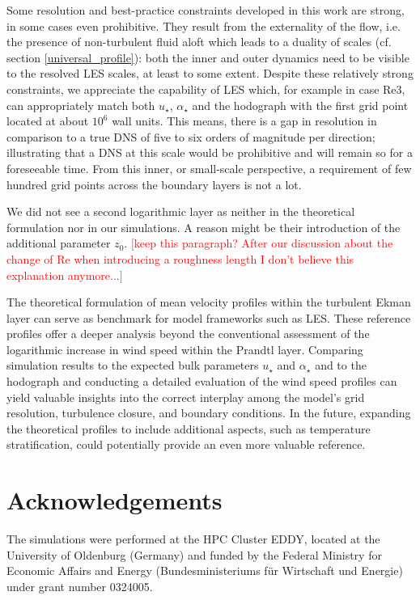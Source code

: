 \documentclass[a4paper,11pt]{article}
\newcommand{\todo}[1]{\textcolor{red}{$[$#1$]$}}
\begin{document}
Some resolution and best-practice constraints developed in this work are strong, in some cases even prohibitive. They result from the externality of the flow, i.e. the presence of non-turbulent fluid aloft which leads to a duality of scales (cf. section \ref{universal_profile}): both the inner and outer dynamics need to be visible to the resolved LES scales, at least to some extent. Despite these relatively strong constraints, we appreciate the capability of LES which, for example in case Re3, can appropriately match both $u_\star$, $\alpha_\star$ and the hodograph with the first grid point located at about $10^6$ wall units. This means, there is a gap in resolution in comparison to a true DNS of five to six orders of magnitude per direction; illustrating that a DNS at this scale would be prohibitive and will remain so for a foreseeable time. From this inner, or small-scale perspective, a requirement of few hundred grid points across the boundary layers is not a lot.

We did not see a second logarithmic layer as \cite{jiang2018large} neither in the theoretical formulation nor in our simulations. A reason might be their introduction of the additional parameter $z_0$. \todo{keep this paragraph? After our discussion about the change of Re when introducing a roughness length I don't believe this explanation anymore...}

The theoretical formulation of mean velocity profiles within the turbulent Ekman layer can serve as benchmark for model frameworks such as LES. These reference profiles offer a deeper analysis beyond the conventional assessment of the logarithmic increase in wind speed within the Prandtl layer. Comparing simulation results to the expected bulk parameters $u_\star$ and $\alpha_\star$ and to the hodograph and conducting a detailed evaluation of the wind speed profiles can yield valuable insights into the correct interplay among the model's grid resolution, turbulence closure, and boundary conditions. In the future, expanding the theoretical profiles to include additional aspects, such as temperature stratification, could potentially provide an even more valuable reference.

\section{Acknowledgements}

The simulations were performed at the HPC Cluster EDDY, located at the University of Oldenburg (Germany) and funded by the Federal Ministry for Economic Affairs and Energy (Bundesministeriums für Wirtschaft und Energie) under grant number 0324005.



\end{document}
